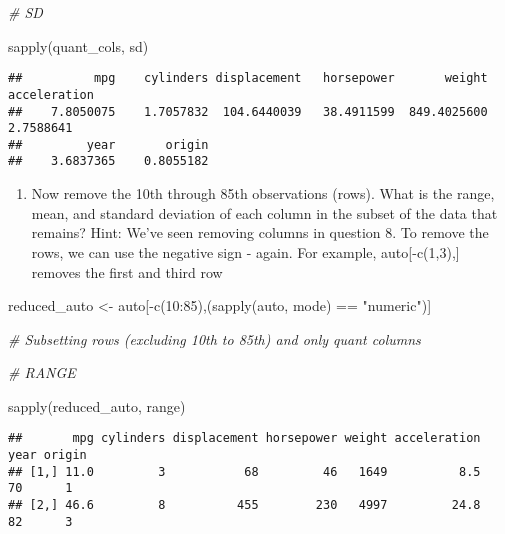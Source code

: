 \documentclass[
]{article}
\newenvironment{Shaded}{\begin{snugshade}}{\end{snugshade}}
\newcommand{\CommentTok}[1]{\textcolor[rgb]{0.56,0.35,0.01}{\textit{#1}}}
\newcommand{\DecValTok}[1]{\textcolor[rgb]{0.00,0.00,0.81}{#1}}
\newcommand{\FunctionTok}[1]{\textcolor[rgb]{0.00,0.00,0.00}{#1}}
\newcommand{\NormalTok}[1]{#1}
\newcommand{\OtherTok}[1]{\textcolor[rgb]{0.56,0.35,0.01}{#1}}
\newcommand{\SpecialCharTok}[1]{\textcolor[rgb]{0.00,0.00,0.00}{#1}}
\newcommand{\StringTok}[1]{\textcolor[rgb]{0.31,0.60,0.02}{#1}}
\providecommand{\tightlist}{%
  \setlength{\itemsep}{0pt}\setlength{\parskip}{0pt}}
\begin{document}
\begin{Shaded}
\begin{Highlighting}[]
\CommentTok{\# SD}

\FunctionTok{sapply}\NormalTok{(quant\_cols, sd)}
\end{Highlighting}
\end{Shaded}

\begin{verbatim}
##          mpg    cylinders displacement   horsepower       weight acceleration 
##    7.8050075    1.7057832  104.6440039   38.4911599  849.4025600    2.7588641 
##         year       origin 
##    3.6837365    0.8055182
\end{verbatim}

\begin{enumerate}
\def\labelenumi{\alph{enumi}.}
\setcounter{enumi}{2}
\tightlist
\item
  Now remove the 10th through 85th observations (rows). What is the
  range, mean, and standard deviation of each column in the subset of
  the data that remains? Hint: We've seen removing columns in question
  8. To remove the rows, we can use the negative sign - again. For
  example, auto{[}-c(1,3),{]} removes the first and third row
\end{enumerate}

\begin{Shaded}
\begin{Highlighting}[]
\NormalTok{reduced\_auto }\OtherTok{\textless{}{-}}\NormalTok{ auto[}\SpecialCharTok{{-}}\FunctionTok{c}\NormalTok{(}\DecValTok{10}\SpecialCharTok{:}\DecValTok{85}\NormalTok{),(}\FunctionTok{sapply}\NormalTok{(auto, mode) }\SpecialCharTok{==} \StringTok{"numeric"}\NormalTok{)]}

\CommentTok{\# Subsetting rows (excluding 10th to 85th) and only quant columns}
\end{Highlighting}
\end{Shaded}

\begin{Shaded}
\begin{Highlighting}[]
\CommentTok{\# RANGE}

\FunctionTok{sapply}\NormalTok{(reduced\_auto, range)}
\end{Highlighting}
\end{Shaded}

\begin{verbatim}
##       mpg cylinders displacement horsepower weight acceleration year origin
## [1,] 11.0         3           68         46   1649          8.5   70      1
## [2,] 46.6         8          455        230   4997         24.8   82      3
\end{verbatim}
\end{document}

